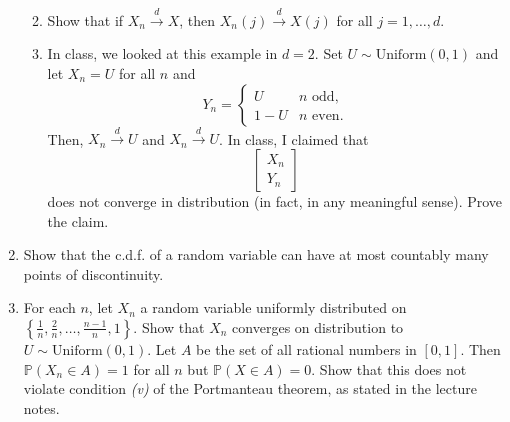 \documentclass[12pt]{article}
\begin{document}
\begin{enumerate}
\begin{enumerate}
\color{black}


 \item Show that if $X_n \stackrel{d}{\rightarrow} X$, then $X_n(j) \stackrel{d}{\rightarrow} X(j)$ for all $j=1,\ldots,d$.\\
\color{black}
 \item In class, we looked at this example in $d=2$. Set $U \sim \mathrm{Uniform}(0,1)$ and let $X_n = U$ for all $n$ and 
\[
Y_n = \left\{ \begin{array}{ll}
 U & n \text{ odd},\\
 1 - U & n \text{ even}.
 \end{array}
 \right.	
\]
Then, $X_n  \stackrel{d}{\rightarrow} U$ and $X_n  \stackrel{d}{\rightarrow} U$. In class, I claimed that 
\[
\left[ \begin{array}{c}
 X_n\\
 Y_n	
 \end{array}
\right]
\]
does not converge in distribution (in fact, in any meaningful sense). Prove the claim.




\color{black}
 \end{enumerate}
 

 
 \item Show that the c.d.f. of a random variable can have at most countably many points of discontinuity.\\
\color{black}
 \item For each $n$, let $X_n$ a random variable uniformly distributed on $\left\{\frac{1}{n}, \frac{2}{n}, \ldots, \frac{n-1}{n}, 1 \right\}$. Show that $X_n$ converges on distribution to $U \sim \mathrm{Uniform}(0,1)$. Let $A$ be the set of all rational numbers in $[0,1]$. Then $\mathbb{P}(X_n \in A) = 1$ for all $n$ but $\mathbb{P}(X \in A) = 0$. Show that this does not violate condition {\it (v)} of the Portmanteau theorem, as stated in the lecture notes.\\
  \color{black}

  \end{enumerate}
\end{document}
